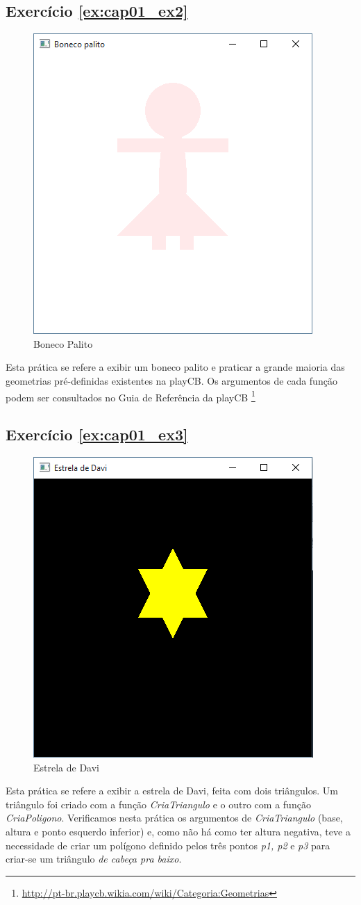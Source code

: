\subsection*{Exercício \ref{ex:cap01_ex2}}
\begin{figure}[ht]
  \centerline{\includegraphics[width=.5\textwidth]{img/cap1_ex3.png}}
  \caption{Boneco Palito}
  \label{fig:cap01_ex2}
\end{figure}
Esta prática se refere a exibir um boneco palito e praticar a grande maioria das geometrias pré-definidas existentes na playCB. Os argumentos de cada função podem ser consultados no Guia de Referência da playCB \footnote{\url{http://pt-br.playcb.wikia.com/wiki/Categoria:Geometrias}}


\subsection*{Exercício \ref{ex:cap01_ex3}}
\begin{figure}[ht]
  \centerline{\includegraphics[width=.5\textwidth]{img/cap1_ex2.png}}
  \caption{Estrela de Davi}
  \label{fig:cap01_ex3}
\end{figure}
Esta prática se refere a exibir a estrela de Davi, feita com dois triângulos. Um triângulo foi criado com a função \emph{CriaTriangulo} e o outro com a função \emph{CriaPoligono}. Verificamos nesta prática os argumentos de \emph{CriaTriangulo} (base, altura e ponto esquerdo inferior) e, como não há como ter altura negativa, teve a necessidade de criar um polígono definido pelos três pontos \emph{p1, p2} e \emph{p3} para criar-se um triângulo \emph{de cabeça pra baixo}.



